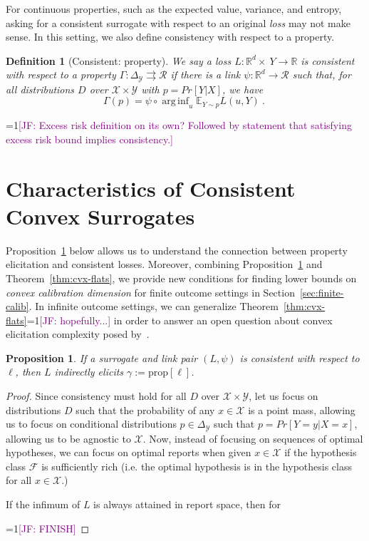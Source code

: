\documentclass{article}
\newcommand{\Comments}{1}
\newcommand{\mynote}[2]{\ifnum\Comments=1\textcolor{#1}{#2}\fi}
\newcommand{\jessie}[1]{\mynote{purple}{[JF: #1]}}
\newcommand{\reals}{\mathbb{R}}
\newcommand{\simplex}{\Delta_\Y}
\newcommand{\prop}[1]{\mathrm{prop}[#1]}
\newcommand{\E}{\mathbb{E}}
\newcommand{\F}{\mathcal{F}}
\newcommand{\R}{\mathcal{R}}
\newcommand{\X}{\mathcal{X}}
\newcommand{\Y}{\mathcal{Y}}
\newcommand{\toto}{\rightrightarrows}
\newtheorem{proposition}{Proposition}
\newtheorem{definition}{Definition}
\DeclareMathOperator*{\arginf}{arg\,inf}
\begin{document}
For continuous properties, such as the expected value, variance, and entropy, asking for a consistent surrogate with respect to an original \emph{loss} may not make sense.
In this setting, we also define consistency with respect to a property. 
\begin{definition}[Consistent: property]
	We say a loss $L:\reals^d \times\ Y \to \reals$ is consistent with respect to a property $\Gamma : \simplex \toto \R$ if there is a link $\psi : \reals^d \to \R$ such that, for all distributions $D$ over $\X \times \Y$ with $p = Pr[Y |X]$, we have
	\begin{equation}
	\Gamma(p) = \psi \circ \arginf_{u} \E_{Y \sim p} L(u,Y)~.~
	\end{equation}
\end{definition}


\jessie{Excess risk definition on its own?  Followed by statement that satisfying excess risk bound implies consistency.}


\section{Characteristics of Consistent Convex Surrogates}\label{sec:char-convex}

Proposition~\ref{prop:consistent-implies-indir-elic} below allows us to understand the connection between property elicitation and consistent losses.
Moreover, combining Proposition~\ref{prop:consistent-implies-indir-elic} and Theorem~\ref{thm:cvx-flats}, we provide new conditions for finding lower bounds on \emph{convex calibration dimension} for finite outcome settings in Section~\ref{sec:finite-calib}.
In infinite outcome settings, we can generalize Theorem~\ref{thm:cvx-flats}\jessie{hopefully...} in order to answer an open question about convex elicitation complexity posed by~\cite{frongillo2015elicitation}.

\begin{proposition}\label{prop:consistent-implies-indir-elic}
	If a surrogate and link pair $(L, \psi)$ is consistent with respect to $\ell$, then $L$ indirectly elicits $\gamma := \prop{\ell}$.
\end{proposition}
\begin{proof}
Since consistency must hold for all $D$ over $\X \times \Y$, let us focus on distributions $D$ such that the probability of any $x \in \X$ is a point mass, allowing us to focus on conditional distributions $p \in \simplex$ such that $p = Pr[Y = y | X = x]$, allowing us to be agnostic to $\X$.
Now, instead of focusing on sequences of optimal hypotheses, we can focus on optimal reports when given $x \in \X$ if the hypothesis class $\F$ is sufficiently rich (i.e. the optimal hypothesis is in the hypothesis class for all $x \in \X$.)

If the infimum of $L$ is always attained in report space, then for 

 \jessie{FINISH}
\end{proof}
\end{document}
